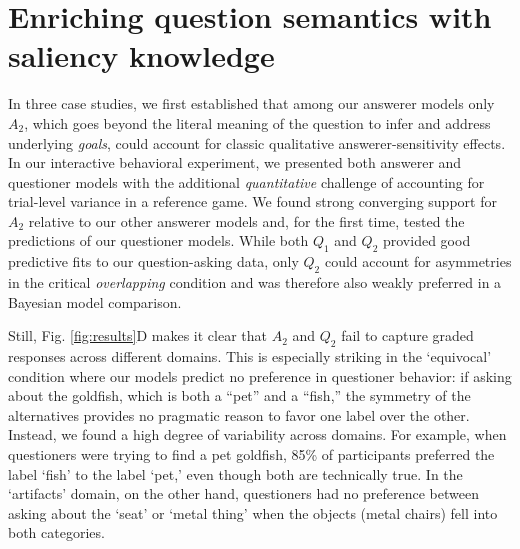 \documentclass[12pt, floatsintext, jou]{apa6}
\begin{document}


\section{Enriching question semantics with saliency knowledge}

In three case studies, we first established that among our answerer models only $A_2$, which goes beyond the literal meaning of the question to infer and address underlying \emph{goals}, could account for classic qualitative answerer-sensitivity effects. In our interactive behavioral experiment, we presented both answerer and questioner models with the additional \emph{quantitative} challenge of accounting for trial-level variance in a reference game. We found strong converging support for $A_2$ relative to our other answerer models and, for the first time, tested the predictions of our questioner models. While both $Q_1$ and $Q_2$ provided good predictive fits to our question-asking data, only $Q_2$ could account for asymmetries in the critical \emph{overlapping} condition and was therefore also weakly preferred in a Bayesian model comparison. 

Still, Fig. \ref{fig:results}D makes it clear that $A_2$ and $Q_2$ fail to capture graded responses across different domains. This is especially striking in the `equivocal' condition where our models predict no preference in questioner behavior: if asking about the goldfish, which is both a ``pet'' and a ``fish,'' the symmetry of the alternatives provides no pragmatic reason to favor one label over the other. Instead, we found a high degree of variability across domains. For example, when questioners were trying to find a pet goldfish, 85\% of participants preferred the label `fish' to the label `pet,' even though both are technically true. In the `artifacts' domain, on the other hand, questioners had no preference between asking about the `seat' or `metal thing' when the objects (metal chairs) fell into both categories.
\end{document}
